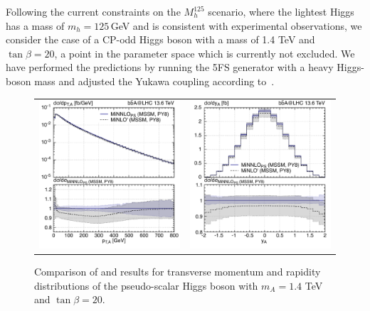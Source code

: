 \documentclass[11pt,a4paper]{article}
\begin{document}
Following the current constraints on the $M_h^{125}$ scenario, where the lightest Higgs has a mass of $m_h= 125$\,GeV and is consistent with experimental observations, we consider the case of a CP-odd Higgs boson with a mass of 1.4 TeV and $\tan\beta = 20$, a point in the parameter space which is currently not excluded. 
We have performed the predictions by running the \minnlo{} 5FS generator with a heavy Higgs-boson mass and adjusted the Yukawa coupling according to~.

\begin{figure}[t!]
\begin{center}
\begin{tabular}{cc}
\includegraphics[width=.45\textwidth, page=1]{plots/5fs/BSM/pt_Higgs__A-1400GeV-PY8-kQ0.pdf}&
\includegraphics[width=.45\textwidth, page=1]{plots/5fs/BSM/y_Higgs__A-1400GeV-PY8-kQ0.pdf}
\end{tabular}
\vspace*{1ex}
\caption{Comparison of \minlo{} and \minnlo{} results for transverse momentum and rapidity distributions of the pseudo-scalar Higgs boson with $m_A=1.4$ TeV and $\tan\beta=20$. \label{fig:MiNLOBSM}}
\end{center}
\end{figure}
\end{document}

